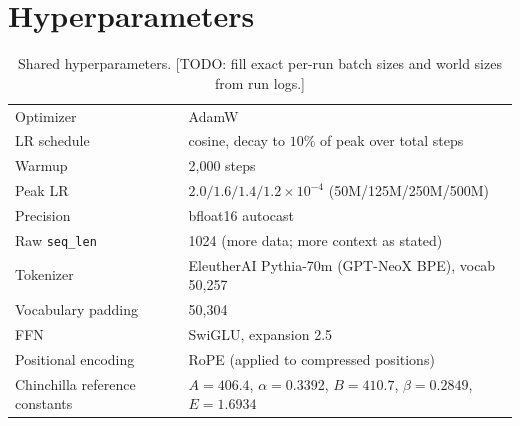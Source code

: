 \documentclass[11pt]{article}
\newcommand{\todo}[1]{\textcolor{warnred}{[TODO: #1]}}
\begin{document}
\section{Hyperparameters}
\label{app:hparams}

\begin{table}[h]
\centering
\caption{Shared hyperparameters. \todo{fill exact per-run batch sizes and
world sizes from run logs.}}
\vspace{0.4em}
\begin{tabular}{ll}
\toprule
Optimizer & AdamW \\
LR schedule & cosine, decay to $10\%$ of peak over total steps \\
Warmup & 2{,}000 steps \\
Peak LR & $2.0/1.6/1.4/1.2 \times 10^{-4}$ (50M/125M/250M/500M) \\
Precision & bfloat16 autocast \\
Raw \texttt{seq\_len} & 1024 (more data; more context as stated) \\
Tokenizer & EleutherAI Pythia-70m (GPT-NeoX BPE), vocab 50{,}257 \\
Vocabulary padding & 50{,}304 \\
FFN & SwiGLU, expansion 2.5 \\
Positional encoding & RoPE (applied to compressed positions) \\
Chinchilla reference constants & $A{=}406.4$, $\alpha{=}0.3392$, $B{=}410.7$, $\beta{=}0.2849$, $E{=}1.6934$ \\
\bottomrule
\end{tabular}
\end{table}
\end{document}
